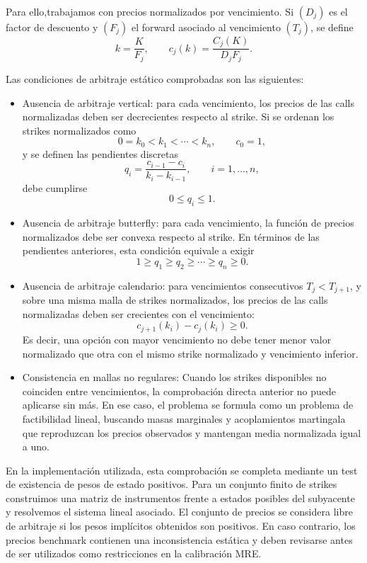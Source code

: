 Para ello,trabajamos con precios normalizados por vencimiento. Si $(D_j)$ es el factor de descuento y $(F_j)$ el forward asociado al vencimiento $(T_j)$, se define
\[
k=\frac{K}{F_j},
\qquad
c_j(k)=\frac{C_j(K)}{D_jF_j}.
\]

Las condiciones de arbitraje estático comprobadas son las siguientes:

\begin{itemize}
\item Ausencia de arbitraje vertical: para cada vencimiento, los precios de las calls normalizadas deben ser decrecientes respecto al strike. Si se ordenan los strikes normalizados como
\[
0=k_0<k_1<\cdots<k_n,
\qquad c_0=1,
\]
y se definen las pendientes discretas
\[
q_i=\frac{c_{i-1}-c_i}{k_i-k_{i-1}},
\qquad i=1,\ldots,n,
\]
debe cumplirse
\[
0\leq q_i\leq 1.
\]

\item Ausencia de arbitraje butterfly: para cada vencimiento, la función de precios normalizados debe ser convexa respecto al strike. En términos de las pendientes anteriores, esta condición equivale a exigir
\[
1\geq q_1\geq q_2\geq \cdots \geq q_n\geq 0.
\]

\item Ausencia de arbitraje calendario: para vencimientos consecutivos \(T_j<T_{j+1}\), y sobre una misma malla de strikes normalizados, los precios de las calls normalizadas deben ser crecientes con el vencimiento:
\[
c_{j+1}(k_i)-c_j(k_i)\geq 0.
\]
Es decir, una opción con mayor vencimiento no debe tener menor valor normalizado que otra con el mismo strike normalizado y vencimiento inferior.

\item Consistencia en mallas no regulares: Cuando los strikes disponibles no coinciden entre vencimientos, la comprobación directa anterior no puede aplicarse sin más. En ese caso, el problema se formula como un problema de factibilidad lineal, buscando masas marginales y acoplamientos martingala que reproduzcan los precios observados y mantengan media normalizada igual a uno.

\end{itemize}

En la implementación utilizada, esta comprobación se completa mediante un test de existencia de pesos de estado positivos. Para un conjunto finito de strikes construimos una matriz de instrumentos frente a estados posibles del subyacente y resolvemos el sistema lineal asociado. El conjunto de precios se considera libre de arbitraje si los pesos implícitos obtenidos son positivos. En caso contrario, los precios benchmark contienen una inconsistencia estática y deben revisarse antes de ser utilizados como restricciones en la calibración MRE.

